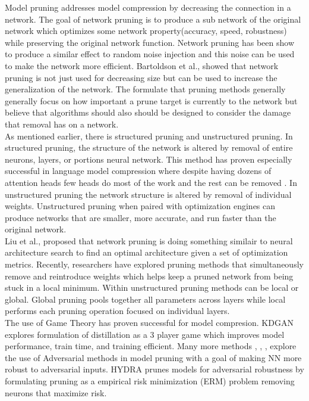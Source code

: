 \documentclass[runningheads]{llncs}
\begin{document}
Model pruning \cite{LeCun1989OptimalBD} addresses model compression by decreasing the connection in a network. The goal of network pruning is to produce a sub network of the original network which optimizes some network property(accuracy, speed, robustness) while preserving the original network function. Network pruning has been show to produce a similar effect to random noise injection \cite{Bartoldson2019TheGT} and this noise can be used to make the network more efficient. Bartoldson et al., showed that network pruning is not just used for decreasing size but can be used to increase the generalization of the network. The formulate that pruning methods generally generally focus on how important a prune target is currently to the network but believe that algorithms should also should be designed to consider the damage that removal has on a network.  \\
As mentioned earlier, there is structured pruning and unstructured pruning. In structured pruning, the structure of the network is altered by removal of entire neurons, layers, or portions neural network. This method has proven especially successful in language model compression where despite having dozens of attention heads \cite{Vaswani2017AttentionIA} few heads do most of the work and the rest can be removed \cite{Michel2019AreSH}. In unstructured pruning the network structure is altered by removal of individual weights. Unstructured pruning when paired with optimization engines can produce networks that are smaller, more accurate, and run faster than the original network. \\
Liu et al., \cite{Liu2019RethinkingTV} proposed that network pruning is doing something similair to neural architecture search to find an optimal architecture given a set of optimization metrics. Recently, researchers have explored pruning methods that simultaneously remove and reintroduce weights \cite{Jia2020StochasticMP} which helps keep a pruned network from being stuck in a local minimum. Within unstructured pruning methods can be local or global. Global pruning pools together all parameters across layers while local performs each pruning operation focused on individual layers. \\
The use of Game Theory has proven successful for model compresion. KDGAN \cite{Wang2018KDGANKD} explores formulation of distillation as a 3 player game which
improves model performance, train time, and training efficient. Many more
methods \cite{Guo2018SparseDW} \cite{Dhillon2018StochasticAP}, \cite{Sehwag2020OnPA}, \cite{Xie2020BlindAP}, explore the use of Adversarial methods in model
pruning with a goal of making NN more robust to adversarial inputs. HYDRA \cite{Sehwag2020HYDRAPA} prunes models for adversarial robustness by formulating pruning as a empirical risk minimization (ERM) problem removing neurons that maximize risk.
\end{document}
